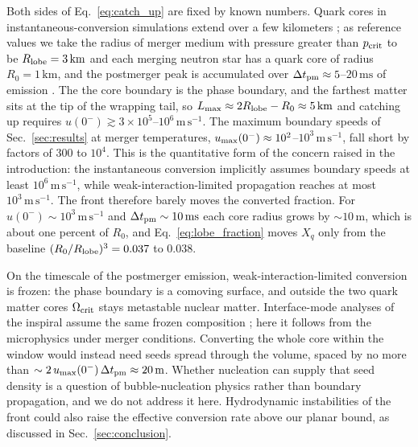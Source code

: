 \documentclass[10pt,superscriptaddress,
amsmath,aps,prc,twocolumn,nofootinbib,floatfix]{revtex4-1}
\newcommand{\m}{\text{m}}
\newcommand{\km}{\text{km}}
\newcommand{\s}{\text{s}}
\begin{document}
{Both sides of Eq.~\eqref{eq:catch_up} are fixed by known numbers.
Quark cores in instantaneous-conversion simulations extend over a few kilometers \cite{Most:2018eaw,Bauswein:2018bma}; as reference values we take the radius of merger medium with pressure greater than $p_{\rm crit}$ to be $R_{\rm lobe}=3\,\km$ and each merging neutron star has a quark core of radius $R_0=1\,\km$, and the postmerger peak is accumulated over $\Delta t_{\rm pm}\approx5$--$20\,\text{ms}$ of emission \cite{Takami:2014tva,Vretinaris:2019spn}.
The the core boundary is the phase boundary, and the farthest matter sits at the tip of the wrapping tail, so $L_{\rm max}\approx2R_{\rm lobe}-R_0\approx5\,\km$ and catching up requires $u(0^-)\gtrsim3\times10^{5}$--$10^{6}\,\m\,\s^{-1}$.
The maximum boundary speeds of Sec.~\ref{sec:results} at merger temperatures, $u_{\rm max}(0^-)\approx10^{2}$--$10^{3}\,\m\,\s^{-1}$, fall short by factors of $300$ to $10^{4}$.
This is the quantitative form of the concern raised in the introduction: the instantaneous conversion implicitly assumes boundary speeds at least $10^{6}\,\m\,\s^{-1}$, while weak-interaction-limited propagation reaches at most $10^{3}\,\m\,\s^{-1}$.
The front therefore barely moves the converted fraction.
For $u(0^-)\sim 10^{3}\,\m\,\s^{-1}$ and $\Delta t_{\rm pm}\sim 10\,\text{ms}$ each core radius grows by $\sim 10\,\m$, which is about one percent of $R_0$, and Eq.~\eqref{eq:lobe_fraction} moves $X_q$ only from the baseline $(R_0/R_{\rm lobe})^3=0.037$ to $0.038$.

On the timescale of the postmerger emission, weak-interaction-limited conversion is frozen: the phase boundary is a comoving surface, and outside the two quark matter cores $\Omega_{\rm crit}$ stays metastable nuclear matter.
Interface-mode analyses of the inspiral assume the same frozen composition \cite{Tonetto:2020bie,Counsell:2025hcv,Pereira:2025xsi}; here it follows from the microphysics under merger conditions.
Converting the whole core within the window would instead need seeds spread through the volume, spaced by no more than $\sim2\,u_{\rm max}(0^-)\,\Delta t_{\rm pm}\approx20\,\m$.
Whether nucleation can supply that seed density is a question of bubble-nucleation physics rather than boundary propagation, and we do not address it here.
Hydrodynamic instabilities of the front could also raise the effective conversion rate above our planar bound, as discussed in Sec.~\ref{sec:conclusion}.

}
\end{document}
